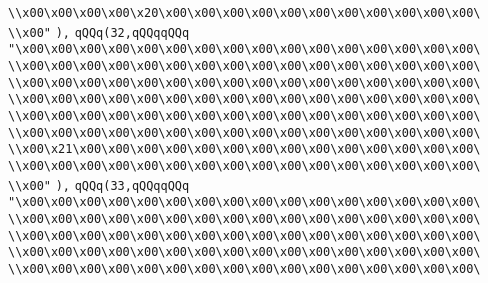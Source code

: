 \verb|\\x00\x00\x00\x00\x20\x00\x00\x00\x00\x00\x00\x00\x00\x00\x00\x00\|\newline
\verb|\\x00"|\newline
\verb|),|\newline
\verb|qQQq(32,qQQqqQQq|\newline
\verb|"\x00\x00\x00\x00\x00\x00\x00\x00\x00\x00\x00\x00\x00\x00\x00\x00\|\newline
\verb|\\x00\x00\x00\x00\x00\x00\x00\x00\x00\x00\x00\x00\x00\x00\x00\x00\|\newline
\verb|\\x00\x00\x00\x00\x00\x00\x00\x00\x00\x00\x00\x00\x00\x00\x00\x00\|\newline
\verb|\\x00\x00\x00\x00\x00\x00\x00\x00\x00\x00\x00\x00\x00\x00\x00\x00\|\newline
\verb|\\x00\x00\x00\x00\x00\x00\x00\x00\x00\x00\x00\x00\x00\x00\x00\x00\|\newline
\verb|\\x00\x00\x00\x00\x00\x00\x00\x00\x00\x00\x00\x00\x00\x00\x00\x00\|\newline
\verb|\\x00\x21\x00\x00\x00\x00\x00\x00\x00\x00\x00\x00\x00\x00\x00\x00\|\newline
\verb|\\x00\x00\x00\x00\x00\x00\x00\x00\x00\x00\x00\x00\x00\x00\x00\x00\|\newline
\verb|\\x00"|\newline
\verb|),|\newline
\verb|qQQq(33,qQQqqQQq|\newline
\verb|"\x00\x00\x00\x00\x00\x00\x00\x00\x00\x00\x00\x00\x00\x00\x00\x00\|\newline
\verb|\\x00\x00\x00\x00\x00\x00\x00\x00\x00\x00\x00\x00\x00\x00\x00\x00\|\newline
\verb|\\x00\x00\x00\x00\x00\x00\x00\x00\x00\x00\x00\x00\x00\x00\x00\x00\|\newline
\verb|\\x00\x00\x00\x00\x00\x00\x00\x00\x00\x00\x00\x00\x00\x00\x00\x00\|\newline
\verb|\\x00\x00\x00\x00\x00\x00\x00\x00\x00\x00\x00\x00\x00\x00\x00\x00\|\newline
